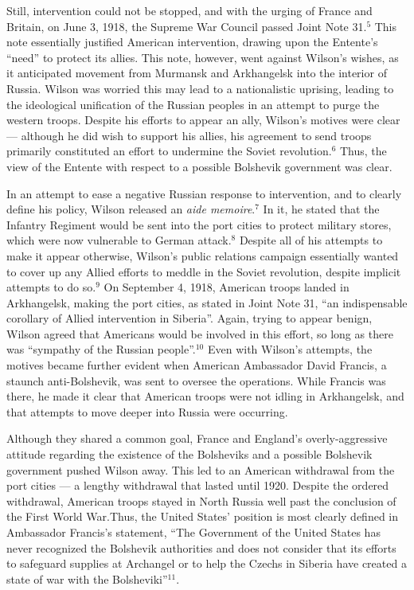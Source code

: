 \begin{justify}
  \hspace{.5in} Still, intervention could not be stopped, and with the urging of France and Britain, on June 3, 1918, the Supreme War Council passed Joint Note 31.$^5$ This note essentially justified American intervention, drawing upon the Entente's ``need'' to protect its allies. This note, however, went against Wilson's wishes, as it anticipated movement from Murmansk and Arkhangelsk into the interior of Russia. Wilson was worried this may lead to a nationalistic uprising, leading to the ideological unification of the Russian peoples in an attempt to purge the western troops. Despite his efforts to appear an ally, Wilson's motives were clear — although he did wish to support his allies, his agreement to send troops primarily constituted an effort to undermine the Soviet revolution.$^6$ Thus, the view of the Entente with respect to a possible Bolshevik government was clear.

  \hspace{.5in} In an attempt to ease a negative Russian response to intervention, and to clearly define his policy, Wilson released an \textit{aide memoire}.$^7$ In it, he stated that the  Infantry Regiment would be sent into the port cities to protect military stores, which were now vulnerable to German attack.$^8$ Despite all of his attempts to make it appear otherwise, Wilson's public relations campaign essentially wanted to cover up any Allied efforts to meddle in the Soviet revolution, despite implicit attempts to do so.$^9$ On September 4, 1918, American troops landed in Arkhangelsk, making the port cities, as stated in Joint Note 31, ``an indispensable corollary of Allied intervention in Siberia''. Again, trying to appear benign, Wilson agreed that Americans would be involved in this effort, so long as there was ``sympathy of the Russian people''.$^{10}$ Even with Wilson's attempts, the motives became further evident when American Ambassador David Francis, a staunch anti-Bolshevik, was sent to oversee the operations. While Francis was there, he made it clear that American troops were not idling in Arkhangelsk, and that attempts to move deeper into Russia were occurring. 

  \hspace{.5in} Although they shared a common goal, France and England's overly-aggressive attitude regarding the existence of the Bolsheviks and a possible Bolshevik government pushed Wilson away. This led to an American withdrawal from the port cities — a lengthy withdrawal that lasted until 1920. Despite the ordered withdrawal, American troops stayed in North Russia well past the conclusion of the First World War.Thus, the United States' position is most clearly defined in Ambassador Francis's statement, ``The Government of the United States has never recognized the Bolshevik authorities and does not consider that its efforts to safeguard supplies at Archangel or to help the Czechs in Siberia have created a state of war with the Bolsheviki''$^{11}$.


\end{justify}
